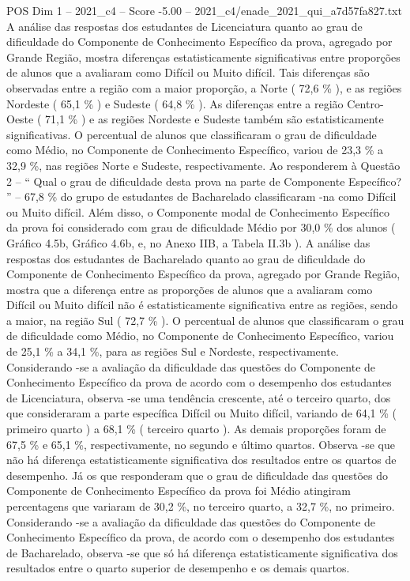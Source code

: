 \begin{textsample}{POS Dim 1 – 2021\_c4 – Score -5.00 – 2021\_c4/enade\_2021\_qui\_a7d57fa827.txt}
A análise das respostas dos estudantes de Licenciatura quanto ao grau de dificuldade do Componente de Conhecimento Específico da prova, agregado por Grande Região, mostra diferenças estatisticamente significativas entre proporções de alunos que a avaliaram como Difícil ou Muito difícil.
Tais diferenças são observadas entre a região com a maior proporção, a Norte ( 72,6 \% ), e as regiões Nordeste ( 65,1 \% ) e Sudeste ( 64,8 \% ).
As diferenças entre a região Centro-Oeste ( 71,1 \% ) e as regiões Nordeste e Sudeste também são estatisticamente significativas.
O percentual de alunos que classificaram o grau de dificuldade como Médio, no Componente de Conhecimento Específico, variou de 23,3 \% a 32,9 \%, nas regiões Norte e Sudeste, respectivamente.
Ao responderem à Questão 2 – “ Qual o grau de dificuldade desta prova na parte de Componente Específico? ” – 67,8 \% do grupo de estudantes de Bacharelado classificaram -na como Difícil ou Muito difícil.
Além disso, o Componente modal de Conhecimento Específico da prova foi considerado com grau de dificuldade Médio por 30,0 \% dos alunos ( Gráfico 4.5b, Gráfico 4.6b, e, no Anexo IIB, a Tabela II.3b ).
A análise das respostas dos estudantes de Bacharelado quanto ao grau de dificuldade do Componente de Conhecimento Específico da prova, agregado por Grande Região, mostra que a diferença entre as proporções de alunos que a avaliaram como Difícil ou Muito difícil não é estatisticamente significativa entre as regiões, sendo a maior, na região Sul ( 72,7 \% ).
O percentual de alunos que classificaram o grau de dificuldade como Médio, no Componente de Conhecimento Específico, variou de 25,1 \% a 34,1 \%, para as regiões Sul e Nordeste, respectivamente.
Considerando -se a avaliação da dificuldade das questões do Componente de Conhecimento Específico da prova de acordo com o desempenho dos estudantes de Licenciatura, observa -se uma tendência crescente, até o terceiro quarto, dos que consideraram a parte específica Difícil ou Muito difícil, variando de 64,1 \% ( primeiro quarto ) a 68,1 \% ( terceiro quarto ).
As demais proporções foram de 67,5 \% e 65,1 \%, respectivamente, no segundo e último quartos.
Observa -se que não há diferença estatisticamente significativa dos resultados entre os quartos de desempenho.
Já os que responderam que o grau de dificuldade das questões do Componente de Conhecimento Específico da prova foi Médio atingiram percentagens que variaram de 30,2 \%, no terceiro quarto, a 32,7 \%, no primeiro.
Considerando -se a avaliação da dificuldade das questões do Componente de Conhecimento Específico da prova, de acordo com o desempenho dos estudantes de Bacharelado, observa -se que só há diferença estatisticamente significativa dos resultados entre o quarto superior de desempenho e os demais quartos.

\end{textsample}
